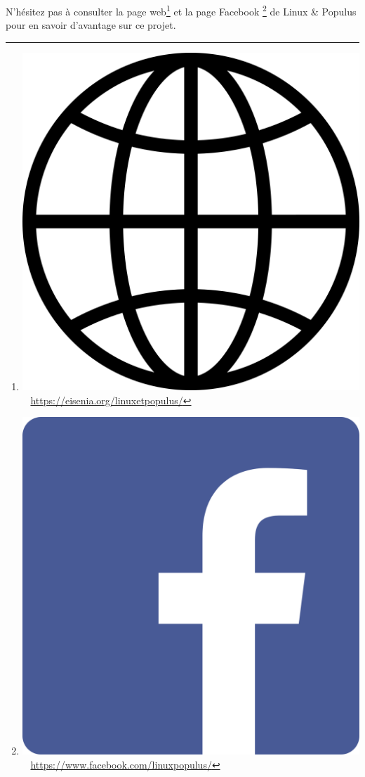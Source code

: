 \documentclass[12pt]{book}
\begin{document}
	N'hésitez pas à consulter la page web\footnote{\includegraphics[scale=.012]{include/web.png}~ \href{https://eisenia.org/linuxetpopulus/}{https://eisenia.org/linuxetpopulus/}} et la page Facebook \footnote{\includegraphics[scale=.006]{include/fb.png}~ \href{https://www.facebook.com/linuxpopulus/}{https://www.facebook.com/linuxpopulus/}} de Linux \& Populus pour en savoir d'avantage sur ce projet.
\end{document}
